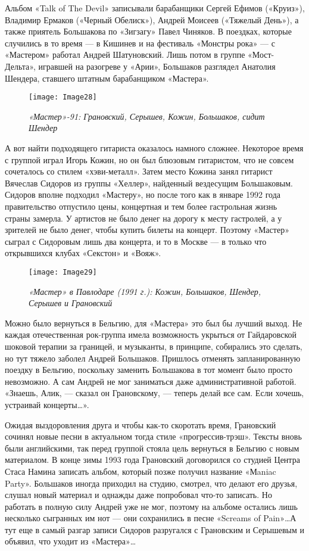 \documentclass[16pt,a5paper,oneside]{book}
\begin{document}
Альбом «Talk of The Devil» записывали барабанщики Сергей Ефимов («Круиз»), Владимир Ермаков («Черный Обелиск»), Андрей
Моисеев («Тяжелый День»), а также приятель Большакова по «Зигзагу» Павел Чиняков. В поездках, которые случились в то
время — в Кишинев и на фестиваль «Монстры рока» — с «Мастером» работал Андрей Шатуновский. Лишь потом в группе
«Мост-Дельта», игравшей на разогреве у «Арии», Большаков разглядел Анатолия Шендера, ставшего штатным барабанщиком
«Мастера».

\begin{figure}
    \centering
    \texttt{[image: Image28]}
    \caption{\textit{«Мастер»-91: Грановский, Серышев, Кожин, Большаков, сидит Шендер}}
\end{figure}

А вот найти подходящего гитариста оказалось намного сложнее. Некоторое время с группой играл Игорь Кожин, но он был
блюзовым гитаристом, что не совсем сочеталось со стилем «хэви-металл». Затем место Кожина занял гитарист Вячеслав
Сидоров из группы «Хеллер», найденный вездесущим Большаковым. Сидоров вполне подходил «Мастеру», но после того как в
январе 1992 года правительство отпустило цены, концертная и тем более гастрольная жизнь страны замерла. У артистов не
было денег на дорогу к месту гастролей, а у зрителей не было денег, чтобы купить билеты на концерт. Поэтому «Мастер»
сыграл с Сидоровым лишь два концерта, и то в Москве — в только что открывшихся клубах «Секстон» и «Вояж».

\begin{figure}
    \centering
    \texttt{[image: Image29]}
    \caption{\textit{«Мастер» в Павлодаре (1991 г.): Кожин, Большаков, Шендер, Серышев и Грановский}}
\end{figure}

Можно было вернуться в Бельгию, для «Мастера» это был бы лучший выход. Не каждая отечественная рок-группа имела
возможность укрыться от Гайдаровской шоковой терапии за границей, и музыканты, в принципе, собирались это сделать, но
тут тяжело заболел Андрей Большаков. Пришлось отменять запланированную поездку в Бельгию, поскольку заменить Большакова
в тот момент было просто невозможно. А сам Андрей не мог заниматься даже административной работой. «Знаешь, Алик, —
сказал он Грановскому, — теперь делай все сам. Если хочешь, устраивай концерты\ldots».

Ожидая выздоровления друга и чтобы как-то скоротать время, Грановский сочинял новые песни в актуальном тогда стиле
«прогрессив-трэш». Тексты вновь были английскими, так перед группой стояла цель вернуться в Бельгию с новым материалом.
В конце зимы 1993 года Грановский договорился со студией Центра Стаса Намина записать альбом, который позже получил
название «Мaniac Party». Большаков иногда приходил на студию, смотрел, что делают его друзья, слушал новый материал и
однажды даже попробовал что-то записать. Но работать в полную силу Андрей уже не мог, поэтому на альбоме остались лишь
несколько сыгранных им нот — они сохранились в песне «Screams of Pain»\ldots А тут еще в самый разгар записи Сидоров
разругался с Грановским и Серышевым и объявил, что уходит из «Мастера»\ldots
\end{document}
